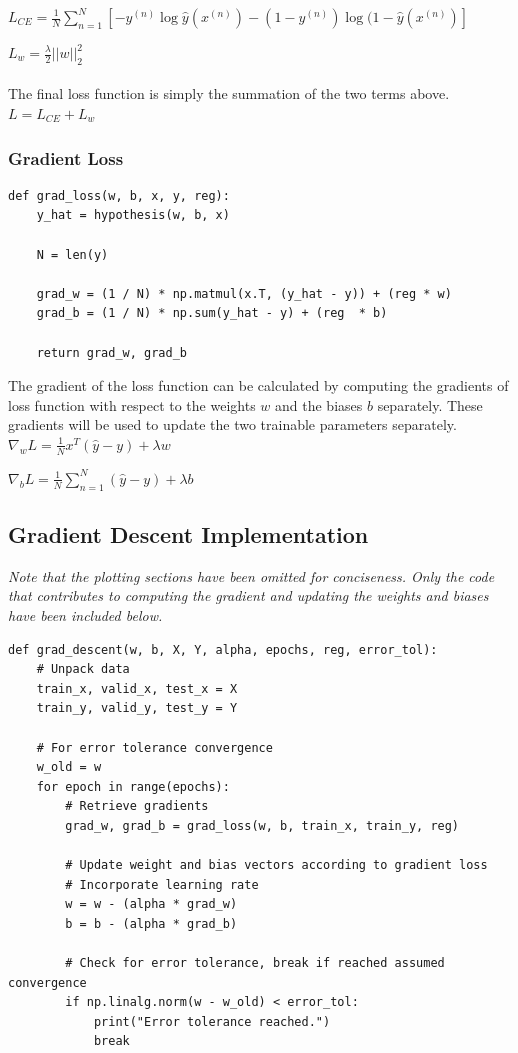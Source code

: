 \documentclass[letter]{article}
\begin{document}
$L_{CE} = \frac{1}{N} \sum_{n = 1}^{N} \left[ -y^{(n)} \log \hat{y}(x^{(n)}) - (1 - y^{(n)}) \log (1 - \hat{y}(x^{(n)})\right]$

$L_w = \frac{\lambda}{2}||w||_2^2$\\\\
%
The final loss function is simply the summation of the two terms above.\\

$L = L_{CE} + L_w$

\subsubsection{Gradient Loss}

\begin{lstlisting}
def grad_loss(w, b, x, y, reg):
    y_hat = hypothesis(w, b, x)

    N = len(y)

    grad_w = (1 / N) * np.matmul(x.T, (y_hat - y)) + (reg * w)
    grad_b = (1 / N) * np.sum(y_hat - y) + (reg  * b)

    return grad_w, grad_b
\end{lstlisting}

The gradient of the loss function can be calculated by computing the gradients of loss function with respect to the weights $w$ and the biases $b$ separately. These gradients will be used to update the two trainable parameters separately.\\

$\nabla_w L = \frac{1}{N} x^T (\hat{y} - y) + \lambda w$

$\nabla_b L = \frac{1}{N} \sum_{n = 1}^{N} (\hat{y} - y) + \lambda b$\\

\subsection{Gradient Descent Implementation}

\textit{Note that the plotting sections have been omitted for conciseness. Only the code that contributes to computing the gradient and updating the weights and biases have been included below.}

\begin{lstlisting}
def grad_descent(w, b, X, Y, alpha, epochs, reg, error_tol):
    # Unpack data
    train_x, valid_x, test_x = X
    train_y, valid_y, test_y = Y

    # For error tolerance convergence
    w_old = w
    for epoch in range(epochs):
        # Retrieve gradients
        grad_w, grad_b = grad_loss(w, b, train_x, train_y, reg)
        
        # Update weight and bias vectors according to gradient loss
        # Incorporate learning rate
        w = w - (alpha * grad_w)
        b = b - (alpha * grad_b)

        # Check for error tolerance, break if reached assumed convergence
        if np.linalg.norm(w - w_old) < error_tol:
            print("Error tolerance reached.")
            break
\end{lstlisting}
\end{document}
